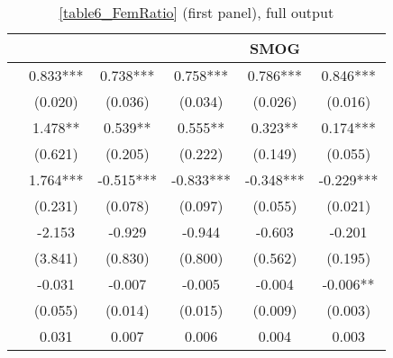 \begin{table}
    \footnotesize
    \centering
    \begin{threeparttable}
        \caption{\autoref{table6_FemRatio} (first panel), full output}
        \label{table6_full}
        \begin{tabular}{p{3cm}S@{}S@{}S@{}S@{}S@{}}
            \toprule
            &{}&{}&{}&{SMOG}&{}\\
            \midrule
                    &       0.833***&       0.738***&       0.758***&       0.786***&       0.846***\\
                                          &     (0.020)   &     (0.036)   &     (0.034)   &     (0.026)   &     (0.016)   \\
                  &       1.478** &       0.539** &       0.555** &       0.323** &       0.174***\\
                                          &     (0.621)   &     (0.205)   &     (0.222)   &     (0.149)   &     (0.055)   \\
                  &       1.764***&      -0.515***&      -0.833***&      -0.348***&      -0.229***\\
                                          &     (0.231)   &     (0.078)   &     (0.097)   &     (0.055)   &     (0.021)   \\
            &      -2.153   &      -0.929   &      -0.944   &      -0.603   &      -0.201   \\
                                          &     (3.841)   &     (0.830)   &     (0.800)   &     (0.562)   &     (0.195)   \\
                    &      -0.031   &      -0.007   &      -0.005   &      -0.004   &      -0.006** \\
                                          &     (0.055)   &     (0.014)   &     (0.015)   &     (0.009)   &     (0.003)   \\
                    &       0.031   &       0.007   &       0.006   &       0.004   &       0.003   \\

\end{tabular}
\end{threeparttable}
\end{table}
